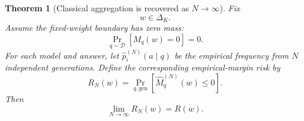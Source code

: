\documentclass{article} %
\newtheorem{theorem}{Theorem}
\providecommand{\D}{\mathcal{D}}
\providecommand{\simplex}{\Delta_K}
\providecommand{\Risk}{R}
\providecommand{\Mhat}{\widehat{M}}
\begin{document}
\begin{theorem}[Classical aggregation is recovered as \(N\to\infty\)]
\label{thm:app4-exact}
Fix
\begin{equation}
\label{eq:app4-fixed-w}
w\in\simplex .
\end{equation}
Assume the fixed-weight boundary has zero mass:
\begin{equation}
\label{eq:app4-fixed-notie}
\Pr_{q\sim\D}\!\left[
M_q(w)=0
\right]
=
0.
\end{equation}
For each model and answer, let \(\widehat p_i^{(N)}(a\mid q)\) be the empirical frequency from \(N\) independent generations.  Define the corresponding empirical-margin risk by
\begin{equation}
\label{eq:app4-rn-fixed}
R_N(w)
=
\Pr_{q,\mathrm{gen}}\!\left[
\Mhat_q^{(N)}(w)\le 0
\right].
\end{equation}
Then
\begin{equation}
\label{eq:app4-exact-limit}
\lim_{N\to\infty}R_N(w)
=
\Risk(w).
\end{equation}
\end{theorem}
\end{document}
